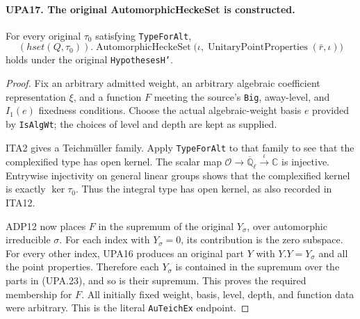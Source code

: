 \documentclass[11pt,a4paper]{article}
\numberwithin{equation}{section}
\theoremstyle{remark}\newtheorem{remark}[theorem]{Remark}
\begin{document}
\paragraph{UPA17. The original AutomorphicHeckeSet is constructed.}
\label{claim:UPA17}
For every original $\tau_0$ satisfying \texttt{Type\allowbreak For\allowbreak Alt},
\[
 (hset(Q,\tau_0)).\operatorname{AutomorphicHeckeSet}
       \bigl(\iota,\operatorname{UnitaryPointProperties}
                              (\bar r,\iota)\bigr)
 \tag{UPA.23}
\]
holds under the original \texttt{Hypotheses\allowbreak H'}.
\begin{proof}
Fix an arbitrary admitted weight, an arbitrary algebraic
coefficient representation $\xi$, and a function $F$
meeting the source's \texttt{Big}, away-level, and
$I_1(e)$ fixedness conditions.  Choose the actual
algebraic-weight basis $e$ provided by
\texttt{Is\allowbreak Alg\allowbreak Wt}; the choices of level and depth
are kept as supplied.

ITA2 gives a Teichm\"uller family.  Apply
\texttt{Type\allowbreak For\allowbreak Alt} to that family to see that the
complexified type has open kernel.  The scalar map
$\mathcal O\to\overline{\mathbb Q}_\ell\xrightarrow{\iota}
\mathbb C$ is injective.  Entrywise injectivity on
general linear groups shows that the complexified
kernel is exactly $\ker\tau_0$.  Thus the integral
type has open kernel, as also recorded in ITA12.

ADP12 now places $F$ in the supremum of the original
$Y_\sigma$, over automorphic irreducible $\sigma$.
For each index with $Y_\sigma=0$, its contribution
is the zero subspace.  For every other index, UPA16
produces an original part $Y$ with $Y.Y=Y_\sigma$
and all the point properties.  Therefore each
$Y_\sigma$ is contained in the supremum over the
parts in (UPA.23), and so is their supremum.
This proves the required membership for $F$.
All initially fixed weight, basis, level, depth,
and function data were arbitrary.  This is the
literal \texttt{Au\allowbreak Teich\allowbreak Ex} endpoint.
\end{proof}

\end{document}
